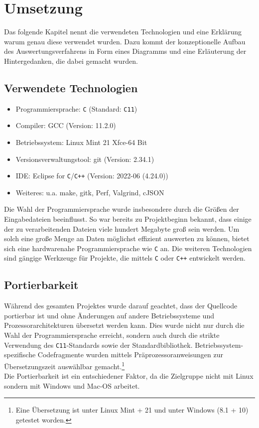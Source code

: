 \documentclass[a4paper,10pt]{article}
\begin{document}
\section{Umsetzung}
    Das folgende Kapitel nennt die verwendeten Technologien und eine Erklärung warum genau diese verwendet wurden. Dazu kommt der konzeptionelle Aufbau des Auswertungsverfahrens in Form eines Diagramms und eine Erläuterung der Hintergedanken, die dabei gemacht wurden.

    \subsection{Verwendete Technologien}
        \begin{itemize}
            \item Programmiersprache: \texttt{C} (Standard: \texttt{C11})
            \item Compiler: GCC (Version: 11.2.0)
            \item Betriebssystem: Linux Mint 21 Xfce-64 Bit
            \item Versionsverwaltungstool: git (Version: 2.34.1)
            \item IDE: Eclipse for \texttt{C}/\texttt{C++} (Version: 2022-06 (4.24.0))
            \item Weiteres: u.a. make, gitk, Perf, Valgrind, cJSON
        \end{itemize}
        Die Wahl der Programmiersprache wurde insbesondere durch die Größen der Eingabedateien beeinflusst. So war bereits zu Projektbeginn bekannt, dass einige der zu verarbeitenden Dateien viele hundert Megabyte groß sein werden. Um solch eine große Menge an Daten möglichst effizient auswerten zu können, bietet sich eine hardwarenahe Programmiersprache wie \texttt{C} an. Die weiteren Technologien sind gängige Werkzeuge für Projekte, die mittels \texttt{C} oder \texttt{C++} entwickelt werden.

    \subsection{Portierbarkeit}
        Während des gesamten Projektes wurde darauf geachtet, dass der Quellcode portierbar ist und ohne Änderungen auf andere Betriebssysteme und Prozessorarchitekturen übersetzt werden kann. Dies wurde nicht nur durch die Wahl der Programmiersprache erreicht, sondern auch durch die strikte Verwendung des \texttt{C11}-Standards sowie der Standardbibliothek. Betriebssystem-spezifische Codefragmente wurden mittels Präprozessoranweisungen zur Übersetzungszeit auswählbar gemacht.\footnote{Eine Übersetzung ist unter Linux Mint + 21 und unter Windows (8.1 + 10) getestet worden.}\\
        Die Portierbarkeit ist ein entschiedener Faktor, da die Zielgruppe nicht mit Linux sondern mit Windows und Mac-OS arbeitet.
\end{document}
